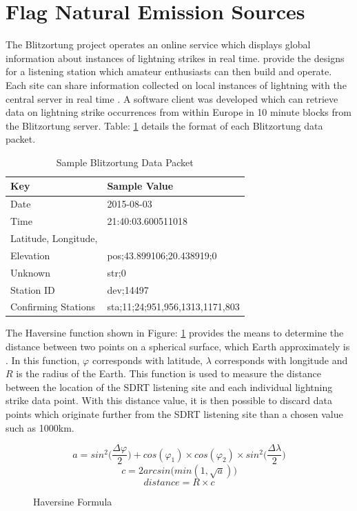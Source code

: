 \documentclass[runningheads,a4paper]{llncs}
\begin{document}
\section*{Flag Natural Emission Sources}
The Blitzortung project operates an online service which displays global information about instances of lightning strikes in real time. \cite{blitzortung-14} provide the designs for a listening station which amateur enthusiasts can then build and operate. Each site can share information collected on local instances of lightning with the central server in real time \citep{blitzortung-14}. A software client was developed which can retrieve data on lightning strike occurrences from within Europe in 10 minute blocks from the Blitzortung server. Table: \ref{tab:blitzortung_data_packet} details the format of each Blitzortung data packet.

%
\begin{table}
	\centering
	\begin{tabular}{p{4cm} l}
		\toprule
		Key & Sample Value\\ \midrule
		Date & 2015-08-03 \\
		Time & 21:40:03.600511018 \\
		Latitude, Longitude,\\Elevation & pos;43.899106;20.438919;0 \\
		Unknown & str;0 \\
		Station ID & dev;14497 \\
		Confirming Stations &  sta;11;24;951,956,1313,1171,803 \\
		\bottomrule
	\end{tabular}
	\caption{Sample Blitzortung Data Packet}
	\label{tab:blitzortung_data_packet}
\end{table}
%

The Haversine function shown in Figure: \ref{fig:haversine_formula} provides the means to determine the distance between two points on a spherical surface, which Earth approximately is \citep{pineda-krch-10}. In this function, $\varphi$ corresponds with latitude, $\lambda$ corresponds with longitude and $R$ is the radius of the Earth. This function is used to measure the distance between the location of the SDRT listening site and each individual lightning strike data point. With this distance value, it is then possible to discard data points which originate further from the SDRT listening site than a chosen value such as 1000km.

%
\begin{figure}[here]
	\centering
	\begin{equation}
		a = sin^2\big(\frac{\Delta \varphi}{2}\big) + cos(\varphi_1) \times cos(\varphi_2) \times sin^2\big(\frac{\Delta \lambda}{2}\big)
	\end{equation}
	\begin{equation}
		c = 2arcsin\big(min(1,\sqrt{a})\big)
	\end{equation}
	\begin{equation}
		distance = R \times c
	\end{equation}
	\caption{Haversine Formula}
	\label{fig:haversine_formula}
\end{figure}
%
\end{document}
